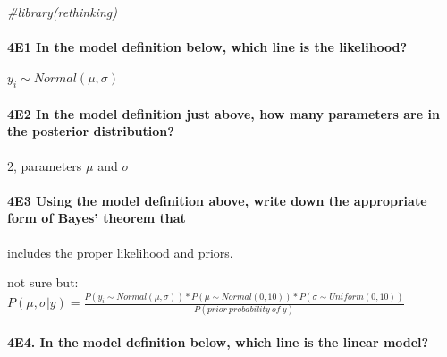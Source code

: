 \documentclass[]{article}
\newenvironment{Shaded}{\begin{snugshade}}{\end{snugshade}}
\newcommand{\CommentTok}[1]{\textcolor[rgb]{0.56,0.35,0.01}{\textit{#1}}}
\let\oldparagraph\paragraph
\renewcommand{\paragraph}[1]{\oldparagraph{#1}\mbox{}}
\begin{document}
\begin{Shaded}
\begin{Highlighting}[]
\CommentTok{#library(rethinking)}
\end{Highlighting}
\end{Shaded}

\hypertarget{e1-in-the-model-definition-below-which-line-is-the-likelihood}{%
\paragraph{4E1 In the model definition below, which line is the
likelihood?}\label{e1-in-the-model-definition-below-which-line-is-the-likelihood}}

\(y_i \sim Normal(\mu, \sigma)\)

\hypertarget{e2-in-the-model-definition-just-above-how-many-parameters-are-in-the-posterior-distribution}{%
\paragraph{4E2 In the model definition just above, how many parameters
are in the posterior
distribution?}\label{e2-in-the-model-definition-just-above-how-many-parameters-are-in-the-posterior-distribution}}

2, parameters \(\mu\) and \(\sigma\)

\hypertarget{e3-using-the-model-definition-above-write-down-the-appropriate-form-of-bayes-theorem-that}{%
\paragraph{4E3 Using the model definition above, write down the
appropriate form of Bayes' theorem
that}\label{e3-using-the-model-definition-above-write-down-the-appropriate-form-of-bayes-theorem-that}}

includes the proper likelihood and priors.

not sure but:
\(P(\mu , \sigma | y) = \frac{P(y_i \sim Normal(\mu, \sigma)) * P(\mu \sim Normal(0,10)) * P(\sigma \sim Uniform(0,10))}{P(prior\ probability\ of\ y)}\)

\hypertarget{e4.-in-the-model-definition-below-which-line-is-the-linear-model}{%
\paragraph{4E4. In the model definition below, which line is the linear
model?}\label{e4.-in-the-model-definition-below-which-line-is-the-linear-model}}
\end{document}
